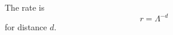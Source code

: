 \documentclass{article}
\begin{document}
The rate is
\begin{equation} r = \Lambda^{-d} \end{equation}
for distance $d$.
\end{document}
